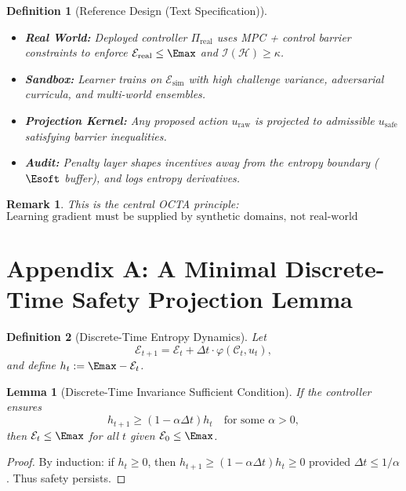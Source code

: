 \documentclass[11pt]{article}
\newtheorem{definition}{Definition}
\newtheorem{lemma}{Lemma}
\newtheorem{remark}{Remark}
\newcommand{\Eenv}{\mathcal{E}}     %
\newcommand{\Hsys}{\mathcal{H}}     %
\newcommand{\Civ}{\mathcal{C}}      %
\newcommand{\I}{\mathcal{I}}        %
\begin{document}
\begin{definition}[Reference Design (Text Specification)]
\begin{itemize}
\item \textbf{Real World:} Deployed controller $\Pi_{\mathrm{real}}$ uses MPC + control barrier constraints to enforce $\Eenv_{\mathrm{real}}\le \Emax$ and $\I(\Hsys)\ge \kappa$.
\item \textbf{Sandbox:} Learner trains on $\Eenv_{\mathrm{sim}}$ with high challenge variance, adversarial curricula, and multi-world ensembles.
\item \textbf{Projection Kernel:} Any proposed action $u_{\text{raw}}$ is projected to admissible $u_{\text{safe}}$ satisfying barrier inequalities.
\item \textbf{Audit:} Penalty layer shapes incentives away from the entropy boundary ($\Esoft$ buffer), and logs entropy derivatives.
\end{itemize}
\end{definition}

\begin{remark}
This is the central OCTA principle:
\[
\boxed{\text{Learning gradient must be supplied by synthetic domains, not real-world entropy.}}
\]
\end{remark}

\section{Appendix A: A Minimal Discrete-Time Safety Projection Lemma}

\begin{definition}[Discrete-Time Entropy Dynamics]
Let
\[
\Eenv_{t+1}=\Eenv_t + \Delta t \cdot \varphi(\Civ_t,u_t),
\]
and define $h_t:=\Emax-\Eenv_t$.
\end{definition}

\begin{lemma}[Discrete-Time Invariance Sufficient Condition]
If the controller ensures
\[
h_{t+1} \ge (1-\alpha\Delta t) h_t
\quad\text{for some }\alpha>0,
\]
then $\Eenv_t\le \Emax$ for all $t$ given $\Eenv_0\le \Emax$.
\end{lemma}

\begin{proof}
By induction: if $h_t\ge 0$, then $h_{t+1}\ge (1-\alpha\Delta t)h_t\ge 0$ provided $\Delta t\le 1/\alpha$. Thus safety persists.
\end{proof}
\end{document}
